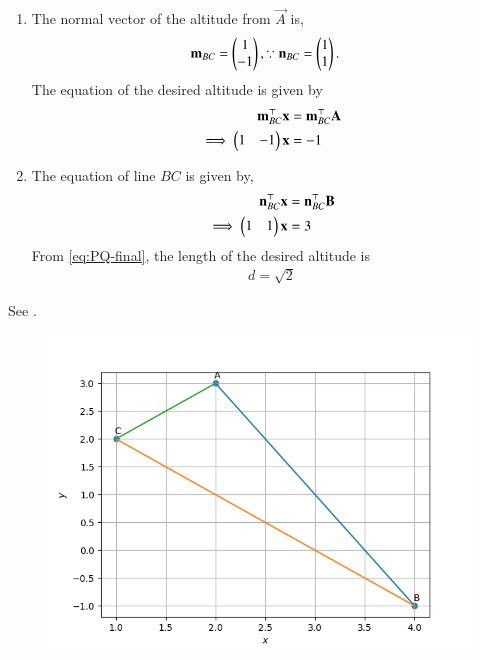 \begin{enumerate}
\item The normal vector of the altitude from $\vec{A}$ is,
\begin{align}
\mathbf{m}_{BC}
= \begin{pmatrix}1\\-1\end{pmatrix},
\because \mathbf{n}_{BC} &= \begin{pmatrix}1\\1\end{pmatrix}.
\end{align}
The equation of the desired altitude  is given by
\begin{align}
\mathbf{m}_{BC}^{\top}\mathbf{x} &=\mathbf{m}_{BC}^{\top}\mathbf{A}\\
\implies \begin{pmatrix}1&-1\end{pmatrix}\mathbf{x} &= -1
\end{align}
	\item
The equation of line $BC$ is given by,
\begin{align}
{\mathbf{n}^{\top}_{BC}}\mathbf{x} &= {\mathbf{n}^{\top}_{BC}}\mathbf{B}\\
\implies \begin{pmatrix}1&1\end{pmatrix}\mathbf{x}  &= 3
\end{align}
			From \eqref{eq:PQ-final},
the length of the desired altitude is 
\begin{align}
d =  \sqrt{2}
\end{align}

\end{enumerate}
See 
.
\begin{figure}[ht]
\centering
\includegraphics[width = \columnwidth]{chapters/11/10/3/17/figs/fig.png}
\caption{}
\label{fig:chapters/11/10/3/17/1}
\end{figure}
